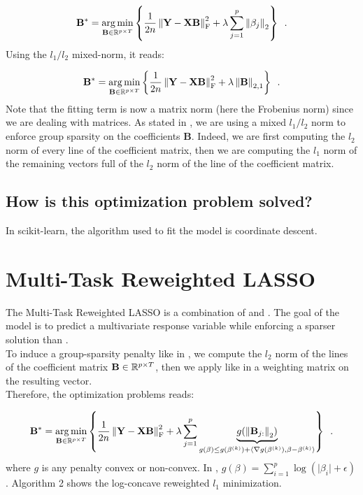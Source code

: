 \documentclass[a4paper,10pt]{article}
\theoremstyle{definition}
\begin{document}
\begin{equation*}
    \mathbf{B}^* = \operatorname*{arg\,min}_{\mathbf{B} \in \mathbb{R}^{p \times T}}
        \left\{
            \frac{1}{2n} \left \lVert  \mathbf{Y} - \mathbf{X B} \right \rVert_{\text{F}}^2
            + \lambda \sum_{j=1}^p \left \lVert  \beta_{j} \right \rVert_2
        \right\}
    \enspace .
\end{equation*}
%
Using the $l_1/l_2$ mixed-norm, it reads:

\begin{equation*}
    \mathbf{B}^* = \operatorname*{arg\,min}_{\mathbf{B} \in \mathbb{R}^{p \times T}}
        \left\{
            \frac{1}{2n} \left \lVert  \mathbf{Y} - \mathbf{XB} \right \rVert_{\text{F}}^2
            + \lambda \left \lVert  \mathbf{B} \right \rVert_{2, 1}
        \right\}
    \enspace .
\end{equation*}
%
Note that the fitting term is now a matrix norm (here the Frobenius norm) since we are dealing with matrices. As stated in , we are using a mixed $l_1/l_2$ norm to enforce group sparsity on the coefficients $\mathbf{B}$. Indeed,
we are first computing the $l_2$ norm of every line of the coefficient matrix, then we are computing the $l_1$ norm of the remaining vectors full of the $l_2$ norm of the line of the coefficient matrix.

\subsection*{How is this optimization problem solved?}

In scikit-learn, the algorithm used to fit the model is coordinate descent.

\section{Multi-Task Reweighted LASSO}
\label{section_5}

The Multi-Task Reweighted LASSO is a combination of  and . The goal of the model is to predict a multivariate response variable while enforcing a sparser solution than .
\\
To induce a group-sparsity penalty like in , we compute the $l_2$ norm of the lines of the coefficient matrix $\mathbf{B} \in \mathbb{R}^{p \times T}$, then we apply like in  a weighting matrix
on the resulting vector.
\\
Therefore, the optimization problems reads:

\begin{equation*}
    \mathbf{B}^* = \operatorname*{arg\,min}_{\mathbf{B} \in \mathbb{R}^{p \times T}}
        \left\{
            \frac{1}{2n} \left \lVert  \mathbf{Y} - \mathbf{XB} \right \rVert_{\text{F}}^2
            + \lambda \sum_{j=1}^p \underbrace{g(\left \lVert \mathbf{B}_{j:} \right \rVert_{2})}_{g(\beta) \leq g(\beta^{(k)}) + \langle \nabla g (\beta^{(k)}) , \beta - \beta^{(k)} \rangle }
        \right\}
    \enspace .
\end{equation*}
%
where $g$ is any penalty convex or non-convex. In \cite{Candes_Wakin_Boyd08}, $g(\beta) = \sum_{i=1}^p \log(\lvert \beta_i \rvert + \epsilon)$. Algorithm 2 shows the log-concave reweighted $l_1$ minimization.
\end{document}
